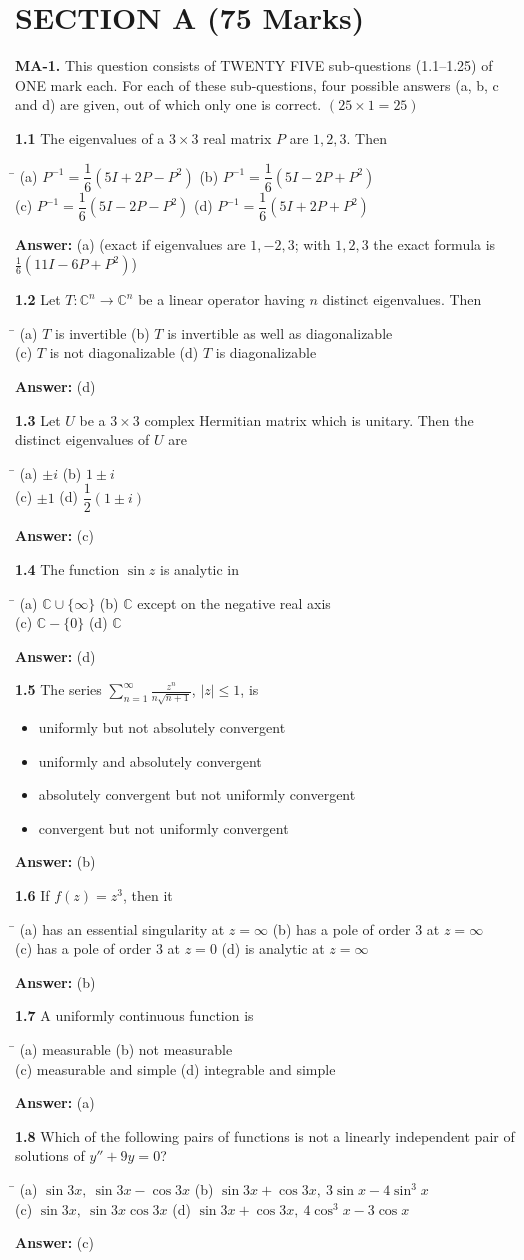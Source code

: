 \documentclass[11pt,a4paper]{article}
\newcommand{\optsfour}[4]{%
  \begin{tabbing}
    \hspace{0.48\linewidth}\=\kill
    (a) #1 \> (b) #2 \\[2pt]
    (c) #3 \> (d) #4
  \end{tabbing}%
}
\newcommand{\optslist}[4]{%
  \begin{itemize}
    \setlength{\itemsep}{2pt}\setlength{\parskip}{0pt}
    \item[(a)] #1
    \item[(b)] #2
    \item[(c)] #3
    \item[(d)] #4
  \end{itemize}%
}
\newcommand{\ans}[1]{\textbf{Answer:} #1\par\medskip}
\begin{document}
\section*{SECTION A (75 Marks)}

\textbf{MA-1.} This question consists of TWENTY FIVE sub-questions (1.1--1.25) of ONE mark each. For each of these sub-questions, four possible answers (a, b, c and d) are given, out of which only one is correct. \hfill $(25 \times 1 = 25)$

\medskip

\textbf{1.1} The eigenvalues of a $3 \times 3$ real matrix $P$ are $1, 2, 3$. Then
\optsfour{$P^{-1} = \dfrac{1}{6}(5I + 2P - P^2)$}{$P^{-1} = \dfrac{1}{6}(5I - 2P + P^2)$}{$P^{-1} = \dfrac{1}{6}(5I - 2P - P^2)$}{$P^{-1} = \dfrac{1}{6}(5I + 2P + P^2)$}
\ans{(a) (exact if eigenvalues are $1, -2, 3$; with $1, 2, 3$ the exact formula is $\frac{1}{6}(11I - 6P + P^2)$)}

\textbf{1.2} Let $T : \mathbb{C}^n \to \mathbb{C}^n$ be a linear operator having $n$ distinct eigenvalues. Then
\optsfour{$T$ is invertible}{$T$ is invertible as well as diagonalizable}{$T$ is not diagonalizable}{$T$ is diagonalizable}
\ans{(d)}

\textbf{1.3} Let $U$ be a $3 \times 3$ complex Hermitian matrix which is unitary. Then the distinct eigenvalues of $U$ are
\optsfour{$\pm i$}{$1 \pm i$}{$\pm 1$}{$\dfrac{1}{2}(1 \pm i)$}
\ans{(c)}

\textbf{1.4} The function $\sin z$ is analytic in
\optsfour{$\mathbb{C} \cup \{\infty\}$}{$\mathbb{C}$ except on the negative real axis}{$\mathbb{C} - \{0\}$}{$\mathbb{C}$}
\ans{(d)}

\textbf{1.5} The series $\displaystyle\sum_{n=1}^{\infty} \frac{z^n}{n\sqrt{n+1}}$, $|z| \le 1$, is
\optslist{uniformly but not absolutely convergent}{uniformly and absolutely convergent}{absolutely convergent but not uniformly convergent}{convergent but not uniformly convergent}
\ans{(b)}

\textbf{1.6} If $f(z) = z^3$, then it
\optsfour{has an essential singularity at $z = \infty$}{has a pole of order $3$ at $z = \infty$}{has a pole of order $3$ at $z = 0$}{is analytic at $z = \infty$}
\ans{(b)}

\textbf{1.7} A uniformly continuous function is
\optsfour{measurable}{not measurable}{measurable and simple}{integrable and simple}
\ans{(a)}

\textbf{1.8} Which of the following pairs of functions is not a linearly independent pair of solutions of $y'' + 9y = 0$?
\optsfour{$\sin 3x,\ \sin 3x - \cos 3x$}{$\sin 3x + \cos 3x,\ 3\sin x - 4\sin^3 x$}{$\sin 3x,\ \sin 3x \cos 3x$}{$\sin 3x + \cos 3x,\ 4\cos^3 x - 3\cos x$}
\ans{(c)}
\end{document}
